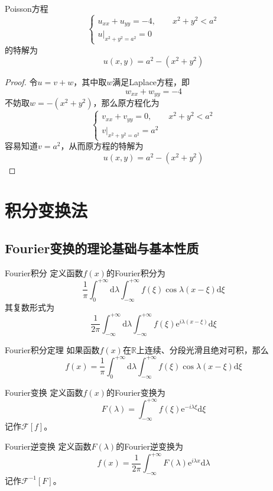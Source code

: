 \documentclass[lang = cn, scheme = chinese, thmcnt = section]{elegantbook}
\newcommand{\R}{\mathbb{R}}            %
\newcommand{\dd}{\mathrm{d}}           %
\newcommand{\ee}[1]{\mathrm{e}^{#1}}   %
\begin{document}
\begin{theorem}
	Poisson方程
	$$
	\begin{cases}
		u_{xx}+u_{yy}=-4,\qquad x^2+y^2<a^2\\
		u|_{x^2+y^2=a^2}=0
	\end{cases}
	$$
	的特解为
	$$
	u(x,y)=a^2-(x^2+y^2)
	$$
\end{theorem}

\begin{proof}
	令$u=v+w$，其中取$w$满足Laplace方程，即%
	$$
	w_{xx}+w_{yy}=-4
	$$
	不妨取$w=-(x^2+y^2)$，那么原方程化为
	$$
	\begin{cases}
		v_{xx}+v_{yy}=0,\qquad x^2+y^2<a^2\\
		v|_{x^2+y^2=a^2}=a^2
	\end{cases}
	$$
	容易知道$v=a^2$，从而原方程的特解为%
	$$
	u(x,y)=a^2-(x^2+y^2)
	$$
\end{proof}

\chapter{积分变换法}

\section{Fourier变换的理论基础与基本性质}

\begin{definition}{Fourier积分}
	定义函数$f(x)$的Fourier积分为%
	$$
	\frac{1}{\pi}\int_{0}^{+\infty}\dd\lambda\int_{-\infty}^{+\infty}f(\xi)\cos\lambda(x-\xi)\dd \xi
	$$
	其复数形式为%
	$$
	\frac{1}{2\pi}\int_{-\infty}^{+\infty}\dd \lambda\int_{-\infty}^{+\infty} f(\xi)\ee{i\lambda(x-\xi)}\dd\xi
	$$
\end{definition}

\begin{theorem}{Fourier积分定理}
	如果函数$f(x)$在$\R$上连续、分段光滑且绝对可积，那么%
	$$
	f(x)=\frac{1}{\pi}\int_{0}^{+\infty}\dd\lambda\int_{-\infty}^{+\infty}f(\xi)\cos\lambda(x-\xi)\dd \xi
	$$
\end{theorem}

\begin{definition}{Fourier变换}
	定义函数$f(x)$的Fourier变换为%
	$$
	F(\lambda)=\int_{-\infty}^{+\infty}f(\xi)\ee{-i\lambda\xi}\dd\xi
	$$
	记作$\mathscr{F}[f]$。
\end{definition}

\begin{definition}{Fourier逆变换}
	定义函数$F(\lambda)$的Fourier逆变换为%
	$$
	f(x)=\frac{1}{2\pi}\int_{-\infty}^{+\infty}F(\lambda)\ee{i\lambda x}\dd\lambda
	$$
	记作$\mathscr{F}^{-1}[F]$。
\end{definition}
\end{document}
